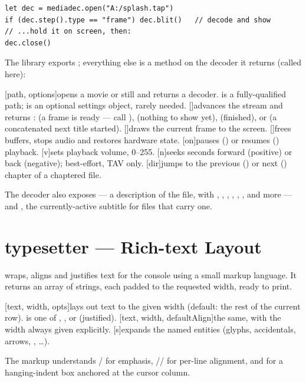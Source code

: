 \begin{lstlisting}
let dec = mediadec.open("A:/splash.tap")
if (dec.step().type == "frame") dec.blit()   // decode and show
// ...hold it on screen, then:
dec.close()
\end{lstlisting}

The library exports ; everything else is a method on the decoder it returns (called  here):

\begin{outline}
\1[path, options]{opens a movie or still and returns a decoder.  is a fully-qualified path;  is an optional settings object, rarely needed.}
\1[]{advances the stream and returns :  (a frame is ready --- call ),  (nothing to show yet),  (finished), or  (a concatenated next title started).}
\1[]{draws the current frame to the screen.}
\1[]{frees buffers, stops audio and restores hardware state.}
\1[on]{pauses () or resumes () playback.}
\1[v]{sets playback volume, 0--255.}
\1[n]{seeks  seconds forward (positive) or back (negative); best-effort, TAV only.}
\1[dir]{jumps to the previous () or next () chapter of a chaptered file.}
\end{outline}

The decoder also exposes  --- a description of the file, with , , , , , ,  and more --- and , the currently-active subtitle for files that carry one.

\section{typesetter --- Rich-text Layout}

 wraps, aligns and justifies text for the console using a small markup language. It returns an array of strings, each padded to the requested width, ready to print.

\begin{outline}
\1[text, width, opts]{lays out text to the given width (default: the rest of the current row).  is one of , ,  or  (justified).}
\1[text, width, defaultAlign]{the same, with the width always given explicitly.}
\1[s]{expands the named entities (glyphs, accidentals, arrows, , \dots).}
\end{outline}
The markup understands / for emphasis, // for per-line alignment, and  for a hanging-indent box anchored at the cursor column.

